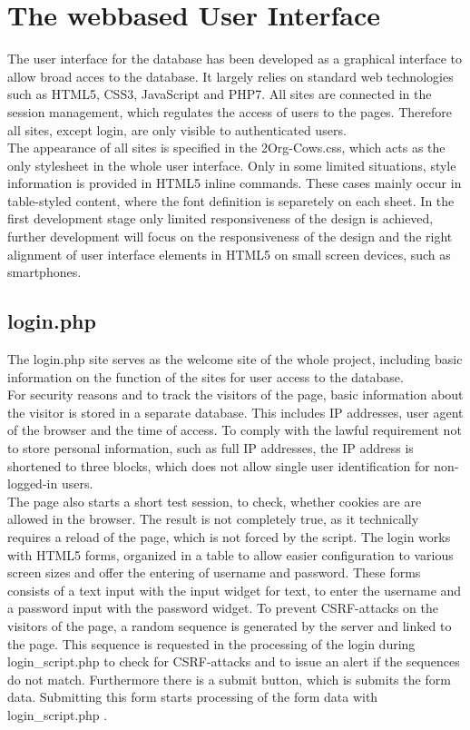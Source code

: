 
\section{The webbased User Interface}
The user interface for the database has been developed as a graphical interface to allow broad acces to the database. It largely relies on standard web technologies such as HTML5, CSS3, 
JavaScript and PHP7. All sites are connected in the session management, which regulates the access of users to the pages. Therefore all sites, except login, are only visible to 
authenticated users.\\
The appearance of all sites is specified in the 2Org-Cows.css, which acts as the only stylesheet in the whole user interface. Only in some limited situations, style information is provided
in HTML5 inline commands. These cases mainly occur in table-styled content, where the font definition is separetely on each sheet.  In the first development stage only limited responsiveness of the design is achieved, further development will focus on the responsiveness of the design
and the right alignment of user interface elements in HTML5 on small screen devices, such as smartphones.


\subsection{login.php}
The login.php site serves as the welcome site of the whole project, including basic information on the function of the sites for user access to the database.\\
For security reasons and to track the visitors of the page, basic information about the visitor is stored in a separate database. This includes IP addresses, user agent of 
the browser and the time of access. To comply with the lawful requirement not to store personal information, such as full IP addresses, the IP address is shortened to three blocks,
which does not allow single user identification for non-logged-in users.\\
The page also starts a short test session, to check, whether cookies are are allowed in the browser. The result is not completely true, as it technically requires a reload of the 
page, which is not forced by the script.
The login works with HTML5 forms, organized in a table to allow easier configuration to various screen sizes and offer the entering of username and password. 
These forms consists of a text input with the input widget for text, to enter the username and a password input with the 
password widget. To prevent CSRF-attacks on the visitors of the page, a random sequence is generated by the server and linked to the page. This sequence is requested in the 
processing of the login during login\_script.php to check for CSRF-attacks and to issue an alert if the sequences do not match. 
Furthermore there is a submit button, which is submits the form data. Submitting this form starts processing of the form data with login\_script.php .

